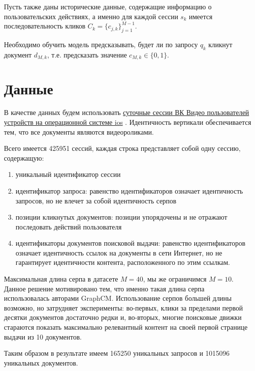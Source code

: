 \documentclass[diploma]{nanolab2015}
\begin{document}
Пусть также даны исторические данные, содержащие информацию о пользовательских действиях, а именно для каждой сессии $s_k$ имеется последовательность кликов $C_k = \{c_{j,k}\}_{j=1}^{M-1}$.

Необходимо обучить модель предсказывать, будет ли по запросу $q_k$ кликнут документ $d_{M, k}$, т.е. предсказать значение $c_{M, k} \in \{0, 1\}$.

\section{Данные}
В качестве данных будем использовать \href{https://github.com/agcr/vk-msu-ir-course-spring-2024/blob/055b4329ad60466c238044d3d1d16d2b9c9764d9/seminars/6-behaviour-ranking/iphone-20240201.tsv.gz}{суточные сессии ВК Видео пользователей устройств на операционной системе ios} \cite{vkds}. Идентичность вертикали обеспечивается тем, что все документы являются видеороликами.

Всего имеется 425951 сессий, каждая строка представляет собой одну сессию, содержащую:

\begin{enumerate}
    \item уникальный идентификатор сессии
    \item идентификатор запроса: равенство идентификаторов означает идентичность запросов, но не влечет за собой идентичность серпов
    \item позиции кликнутых документов: позиции упорядочены и не отражают последовать действий пользователя
    \item идентификаторы документов поисковой выдачи: равенство идентификаторов означает идентичность ссылок на документы в сети Интернет, но не гарантирует идентичности контента, расположенного по этим ссылкам.
\end{enumerate}

Максимальная длина серпа в датасете $M = 40$, мы же ограничимся $M = 10$. Данное решение мотивировано тем, что именно такая длина серпа использовалась авторами GraphCM. Использование серпов большей длины возможно, но затрудняет эксперименты: во-первых, клики за пределами первой десятки документов достаточно редки и, во-вторых, многие поисковые движки стараются показать максимально релевантный контент на своей первой странице выдачи из 10 документов.

Таким образом в результате имеем 165250 уникальных запросов и 1015096 уникальных документов.
\end{document}

